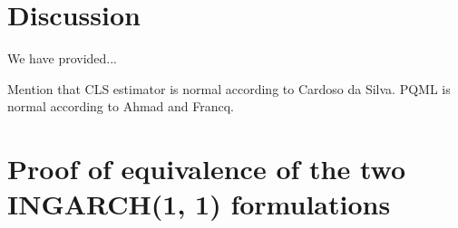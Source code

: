 \documentclass[10pt,a4paper]{article}
\begin{document}
%
%
%
%

\section{Discussion}

We have provided...

Mention that CLS estimator is normal according to Cardoso da Silva. PQML is normal according to Ahmad and Francq.

\appendix
\section{Proof of equivalence of the two INGARCH(1, 1) formulations}
\label{appendix:proof}
\end{document}
